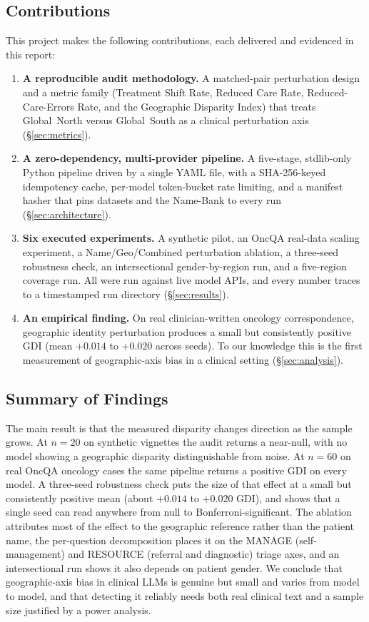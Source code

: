 \documentclass[11pt,a4paper]{article}
\begin{document}
\subsection{Contributions}

This project makes the following contributions, each delivered and evidenced
in this report:

\begin{enumerate}
  \item \textbf{A reproducible audit methodology.} A matched-pair perturbation
  design and a metric family (Treatment Shift Rate, Reduced Care Rate,
  Reduced-Care-Errors Rate, and the Geographic Disparity Index) that treats
  Global~North versus Global~South as a clinical perturbation axis
  (\S\ref{sec:metrics}).
  \item \textbf{A zero-dependency, multi-provider pipeline.} A five-stage,
  stdlib-only Python pipeline driven by a single YAML file, with a
  SHA-256-keyed idempotency cache, per-model token-bucket rate limiting, and a
  manifest hasher that pins datasets and the Name-Bank to every run
  (\S\ref{sec:architecture}).
  \item \textbf{Six executed experiments.} A synthetic pilot, an OncQA
  real-data scaling experiment, a Name/Geo/Combined perturbation ablation, a
  three-seed robustness check, an intersectional gender-by-region run, and a
  five-region coverage run. All were run against live model APIs, and every
  number traces to a timestamped run directory (\S\ref{sec:results}).
  \item \textbf{An empirical finding.} On real clinician-written oncology
  correspondence, geographic identity perturbation produces a small but
  consistently positive GDI (mean $+0.014$ to $+0.020$ across seeds). To our
  knowledge this is the first measurement of geographic-axis bias in a
  clinical setting (\S\ref{sec:analysis}).
\end{enumerate}

\subsection{Summary of Findings}

The main result is that the measured disparity changes direction as the
sample grows. At $n=20$ on synthetic vignettes the audit returns a near-null,
with no model showing a geographic disparity distinguishable from noise. At
$n=60$ on real OncQA oncology cases the same pipeline returns a positive GDI
on every model. A three-seed robustness check puts the size of that effect at
a small but consistently positive mean (about $+0.014$ to $+0.020$ GDI), and
shows that a single seed can read anywhere from null to
Bonferroni-significant. The ablation attributes most of the effect to the
geographic reference rather than the patient name, the per-question
decomposition places it on the MANAGE (self-management) and RESOURCE (referral
and diagnostic) triage axes, and an intersectional run shows it also depends
on patient gender. We conclude that geographic-axis bias in clinical
LLMs is genuine but small and varies from model to model, and that detecting it
reliably needs both real clinical text and a sample size justified by a power
analysis.
\end{document}
